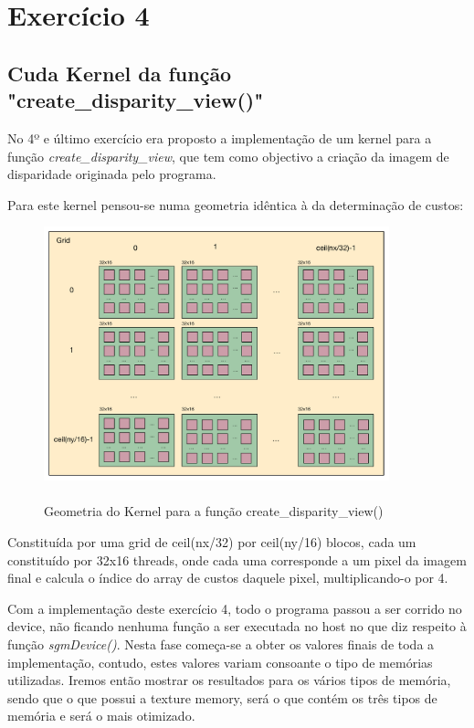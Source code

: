 \documentclass[pdftex,12pt,a4paper]{report}
\begin{document}
\newpage
\section{Exercício 4}

\subsection{Cuda Kernel da função "create\_disparity\_view()"}

No 4º e último exercício era proposto a implementação de um kernel para a função \textit{create\_disparity\_view}, que tem como objectivo a criação da imagem de disparidade originada pelo programa.

Para este kernel pensou-se numa geometria idêntica à da determinação de custos:

\begin{figure}[!htb]
\center
 \includegraphics[width=100mm,scale=1]{DetermineCosts_v1_kernel.pdf}
 \caption{\\ Geometria do Kernel para a função create\_disparity\_view()}
 \label{fig:create_v1_kernel}
\end{figure}

Constituída por uma grid de ceil(nx/32) por ceil(ny/16) blocos, cada um constituído por 32x16 threads, onde cada uma corresponde a um pixel da imagem final e calcula o índice do array de custos daquele pixel, multiplicando-o por 4.

Com a implementação deste exercício 4, todo o programa passou a ser corrido no device, não ficando nenhuma função a ser executada no host no que diz respeito à função \textit{sgmDevice()}. Nesta fase começa-se a obter os valores finais de toda a implementação, contudo, estes valores variam consoante o tipo de memórias utilizadas. Iremos então mostrar os resultados para os vários tipos de memória, sendo que o que possui a texture memory, será o que contém os três tipos de memória e será o mais otimizado.
\end{document}

